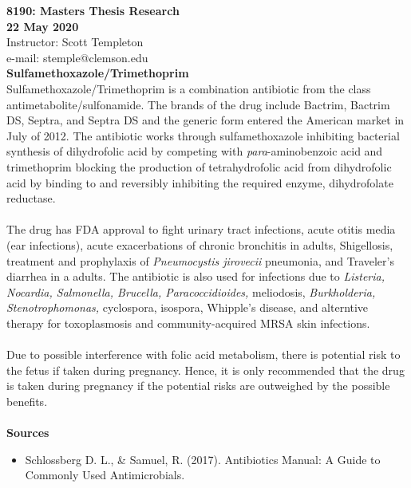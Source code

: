 
\let\counterwithout\relax
\let\counterwithin\relax
{}



\noindent \textbf{8190: Masters Thesis Research}\\
\noindent \textbf{22 May 2020}\\
\noindent Instructor: Scott Templeton \\
e-mail: stemple@clemson.edu\\

\noindent \textbf{Sulfamethoxazole/Trimethoprim}\\
Sulfamethoxazole/Trimethoprim is a combination antibiotic from the class antimetabolite/sulfonamide. The brands of the drug include Bactrim, Bactrim DS, Septra, and Septra DS and the generic form entered the American market in July of 2012. The antibiotic works through sulfamethoxazole inhibiting bacterial synthesis of dihydrofolic acid by competing with \textit{para}-aminobenzoic acid and trimethoprim blocking the production of tetrahydrofolic acid from dihydrofolic acid by binding to and reversibly inhibiting the required enzyme, dihydrofolate reductase.\\
\\
The drug has FDA approval to fight urinary tract infections, acute otitis media (ear infections), acute exacerbations of chronic bronchitis in adults, Shigellosis, treatment and prophylaxis of \textit{Pneumocystis jirovecii} pneumonia, and Traveler's diarrhea in a adults. The antibiotic is also used for infections due to \textit{Listeria, Nocardia, Salmonella, Brucella, Paracoccidioides,} meliodosis, \textit{Burkholderia, Stenotrophomonas,} cyclospora, isospora, Whipple's disease, and alterntive therapy for toxoplasmosis and community-acquired MRSA skin infections.\\
\\
Due to possible interference with folic acid metabolism, there is potential risk to the fetus if taken during pregnancy. Hence, it is only recommended that the drug is taken during pregnancy if the potential risks are outweighed by the possible benefits.\\
\\
\textbf{Sources}
\begin{itemize}
    \item Schlossberg D. L., \& Samuel, R. (2017). Antibiotics Manual: A Guide to Commonly Used Antimicrobials.
\end{itemize}




